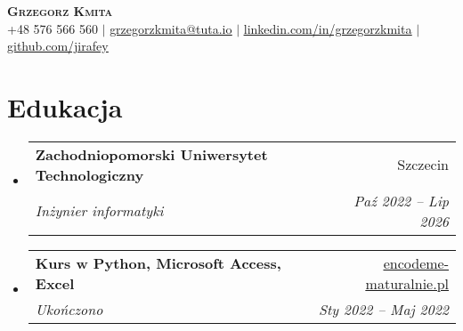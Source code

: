 \documentclass[letterpaper,11pt]{article}
\makeatletter
\newcommand{\resumeSubheading}[4]{
  \vspace{-2pt}\item
    \begin{tabular*}{0.97\textwidth}[t]{l@{\extracolsep{\fill}}r}
      \textbf{#1} & #2 \\
      \textit{\small#3} & \textit{\small #4} \\
    \end{tabular*}\vspace{-7pt}
}
\newcommand{\resumeSubHeadingListStart}{\begin{itemize}[leftmargin=0.15in, label={}]}
\newcommand{\resumeSubHeadingListEnd}{\end{itemize}}
\makeatother
\begin{document}

\begin{center}
    \textbf{\Huge \scshape Grzegorz Kmita} \\ \vspace{1pt}
    \small +48 576 566 560 $|$ \href{mailto:grzegorzkmita@tuta.io}{\underline{grzegorzkmita@tuta.io}} $|$
    \href{https://linkedin.com/in/grzegorzkmita}{\underline{linkedin.com/in/grzegorzkmita}} $|$
    \href{https://github.com/jirafey}{\underline{github.com/jirafey}}
\end{center}

\section{Edukacja}
  \resumeSubHeadingListStart
    \resumeSubheading
      {Zachodniopomorski Uniwersytet Technologiczny}{Szczecin} 
      {Inżynier informatyki}{Paź 2022 -- Lip 2026}
      \resumeSubheading
    {Kurs w Python, Microsoft Access, Excel}{\href{https://encodeme-maturalnie.pl}
    {\underline{encodeme-maturalnie.pl}}}{Ukończono}{Sty 2022 -- Maj 2022}

  \resumeSubHeadingListEnd


\end{document}
